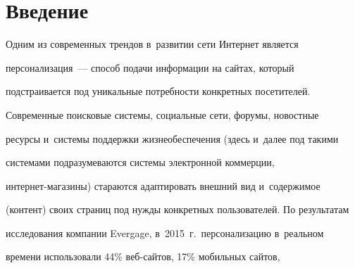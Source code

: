




















      \thispagestyle{headings}


      


                        \vspace*{-16pt}


  


\section{Введение}





\vspace*{-2pt}





  Одним из современных трендов в~развитии сети Интернет является 


персонализация~--- способ подачи информации на сайтах, который 


подстраивается под уникальные потребности конкретных посетителей. 


Современные поисковые системы, социальные сети, форумы, новостные 


ресурсы и~системы поддержки жизнеобеспечения (здесь и~далее под такими 


системами подразумеваются системы электронной коммерции,  


ин\-тер\-нет-ма\-га\-зи\-ны) стараются адаптировать внешний вид и~содержимое 


(контент) своих страниц под нужды конкретных пользователей. По результатам 


исследования компании Evergage, в~2015~г.\ персонализацию в~реальном 


времени использовали 44\% веб-сай\-тов, 17\% мобильных сайтов,  


